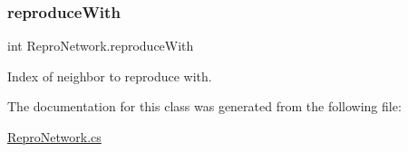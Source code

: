 \subsubsection{\texorpdfstring{reproduce\+With}{reproduceWith}}
{\footnotesize\ttfamily int Repro\+Network.\+reproduce\+With}



Index of neighbor to reproduce with. 



The documentation for this class was generated from the following file\+:\begin{DoxyCompactItemize}
\item 
\mbox{\hyperlink{_repro_network_8cs}{Repro\+Network.\+cs}}\end{DoxyCompactItemize}
